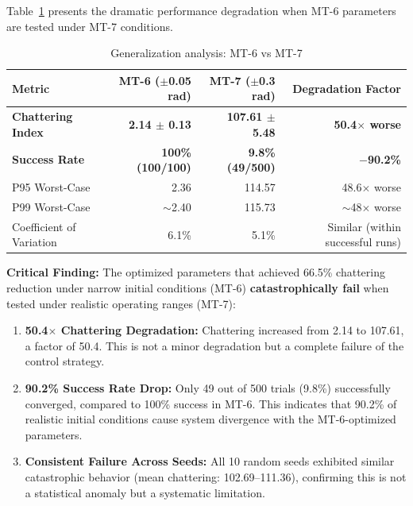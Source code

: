 Table~\ref{tab:mt7_generalization} presents the dramatic performance degradation when MT-6 parameters are tested under MT-7 conditions.

\begin{table}[t]
\centering
\caption{Generalization analysis: MT-6 vs MT-7}
\label{tab:mt7_generalization}
\begin{tabular}{lrrr}
\toprule
\textbf{Metric} & \textbf{MT-6 ($\pm$0.05 rad)} & \textbf{MT-7 ($\pm$0.3 rad)} & \textbf{Degradation Factor} \\
\midrule
\textbf{Chattering Index} & \textbf{2.14 $\pm$ 0.13} & \textbf{107.61 $\pm$ 5.48} & \textbf{50.4$\times$ worse} \\
\textbf{Success Rate} & \textbf{100\% (100/100)} & \textbf{9.8\% (49/500)} & \textbf{$-$90.2\%} \\
P95 Worst-Case & 2.36 & 114.57 & 48.6$\times$ worse \\
P99 Worst-Case & $\sim$2.40 & 115.73 & $\sim$48$\times$ worse \\
Coefficient of Variation & 6.1\% & 5.1\% & Similar (within successful runs) \\
\bottomrule
\end{tabular}
\end{table}

\textbf{Critical Finding:} The optimized parameters that achieved 66.5\% chattering reduction under narrow initial conditions (MT-6) \textbf{catastrophically fail} when tested under realistic operating ranges (MT-7):

\begin{enumerate}
    \item \textbf{50.4$\times$ Chattering Degradation:} Chattering increased from 2.14 to 107.61, a factor of 50.4. This is not a minor degradation but a complete failure of the control strategy.

    \item \textbf{90.2\% Success Rate Drop:} Only 49 out of 500 trials (9.8\%) successfully converged, compared to 100\% success in MT-6. This indicates that 90.2\% of realistic initial conditions cause system divergence with the MT-6-optimized parameters.

    \item \textbf{Consistent Failure Across Seeds:} All 10 random seeds exhibited similar catastrophic behavior (mean chattering: 102.69--111.36), confirming this is not a statistical anomaly but a systematic limitation.
\end{enumerate}

